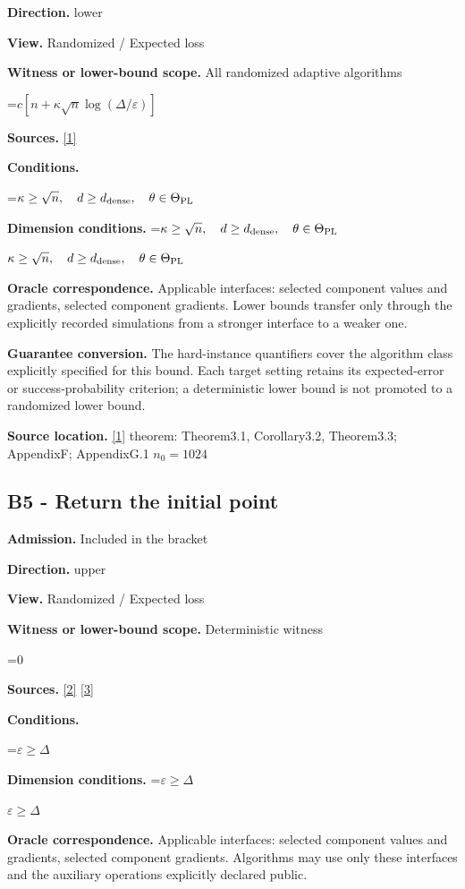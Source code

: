 \documentclass[10pt,a4paper]{article}
\newcommand{\AtlasMath}[1]{\par\begingroup\centering\setbox0=\hbox{$\displaystyle #1$}\ifdim\wd0>1.4\linewidth\typeout{ATLAS WIDE FORMULA: \the\wd0}\fi\ifdim\wd0>\linewidth\resizebox{\linewidth}{!}{\box0}\else\box0\fi\par\endgroup}
\newcommand{\AtlasInlineMath}[1]{\begingroup\setbox0=\hbox{$#1$}\ifdim\wd0>.4\linewidth\endgroup\AtlasMath{#1}\else\endgroup$#1$\fi}
\begin{document}
\textbf{Direction.} lower

\textbf{View.} Randomized / Expected loss

\textbf{Witness or lower-bound scope.} All randomized adaptive algorithms

\AtlasMath{c[n+\kappa\sqrt n\log(\Delta/\varepsilon)]}
\textbf{Sources.} \href{https://arxiv.org/pdf/2609.00045v3}{[1]}

\textbf{Conditions.} 
\AtlasMath{\kappa\ge\sqrt n,\quad d\ge d_{\rm dense},\quad\theta\in\Theta_{\rm PL}}


\textbf{Dimension conditions.} \AtlasInlineMath{\kappa\ge\sqrt n,\quad d\ge d_{\rm dense},\quad\theta\in\Theta_{\rm PL}}

\textbf{Oracle correspondence.} Applicable interfaces: selected component values and gradients, selected component gradients. Lower bounds transfer only through the explicitly recorded simulations from a stronger interface to a weaker one.

\textbf{Guarantee conversion.} The hard-instance quantifiers cover the algorithm class explicitly specified for this bound. Each target setting retains its expected-error or success-probability criterion; a deterministic lower bound is not promoted to a randomized lower bound.

\textbf{Source location.} \href{https://arxiv.org/pdf/2609.00045v3}{[1]} theorem: Theorem3.1, Corollary3.2, Theorem3.3; AppendixF; AppendixG.1 $n_0=1024$

\subsection{B5 - Return the initial point}
\textbf{Admission.} Included in the bracket

\textbf{Direction.} upper

\textbf{View.} Randomized / Expected loss

\textbf{Witness or lower-bound scope.} Deterministic witness

\AtlasMath{0}
\textbf{Sources.} \href{https://proceedings.mlr.press/v97/zhou19b/zhou19b.pdf}{[2]} \href{https://arxiv.org/pdf/1405.4980}{[3]}

\textbf{Conditions.} 
\AtlasMath{\varepsilon\ge\Delta}


\textbf{Dimension conditions.} \AtlasInlineMath{\varepsilon\ge\Delta}

\textbf{Oracle correspondence.} Applicable interfaces: selected component values and gradients, selected component gradients. Algorithms may use only these interfaces and the auxiliary operations explicitly declared public.
\end{document}
